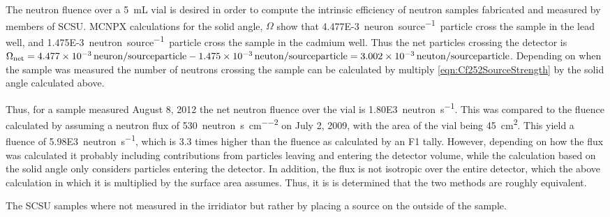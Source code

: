 \documentclass[draftcls,onecolumn]{IEEEtran}
\begin{document}
\begin{Exercise*}[label={LiquidSample},title={Liquid Sample},name={Example}]
The neutron fluence over a \SI{5}{\milli\liter} vial is desired in order to compute the intrinsic efficiency of neutron samples fabricated and measured by members of SCSU.
MCNPX calculations for the solid angle, $\Omega$ show that \SI{4.477E-3}{neuron\per source particle} cross the sample in the lead well, and \SI{1.475E-3}{neutron\per source particle} cross the sample in the cadmium well.
Thus the net particles crossing the detector is $\Omega_{\text{net}} =\SI{4.477E-3}{neuron\per source particle} - \SI{1.475E-3}{neuton\per source particle} =\SI{3.002E-3}{neuton\per source particle} $.
Depending on when the sample was measured the number of neutrons crossing the sample can be calculated by multiply \eqref{eqn:Cf252SourceStrength} by the solid angle calculated above.

Thus, for a sample measured August 8, 2012 the net neutron fluence over the vial is  \SI{1.80E3}{neutron\per\second}.
This was compared to the fluence calculated by assuming a neutron flux of \SI{530}{neutron\per\second\per\cm\squared} on July 2, 2009, with the area of the vial being \SI{45}{\cm\squared}.
This yield a fluence of \SI{5.98E3}{neutron\per\second}, which is 3.3 times higher than the fluence as calculated by an F1 tally.
However, depending on how the flux was calculated it probably including contributions from particles leaving and entering the detector volume, while the calculation based on the solid angle only considers particles entering the detector.
In addition, the flux is not isotropic over the entire detector, which the above calculation in which it is multiplied by the surface area assumes.
Thus, it is is determined that the two methods are roughly equivalent.


The SCSU samples where not measured in the  irridiator but rather by placing a source on the outside of the sample.

\end{Exercise*}



\pagebreak
\appendices
\end{document}
